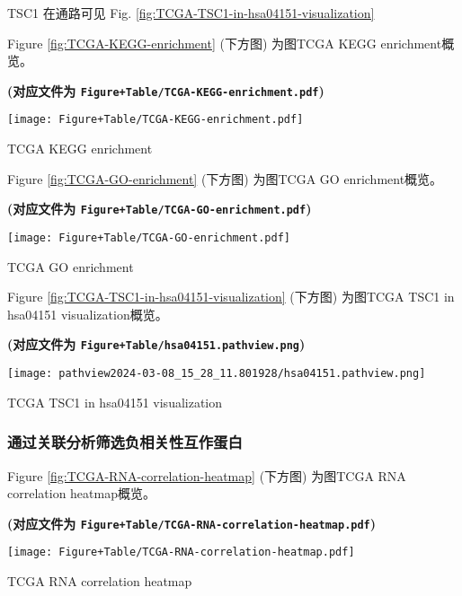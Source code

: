 \documentclass[
]{article}
\begin{document}
TSC1 在通路可见 Fig. \ref{fig:TCGA-TSC1-in-hsa04151-visualization}

Figure \ref{fig:TCGA-KEGG-enrichment} (下方图) 为图TCGA KEGG enrichment概览。

\textbf{(对应文件为 \texttt{Figure+Table/TCGA-KEGG-enrichment.pdf})}

\def\@captype{figure}
\begin{center}
\texttt{[image: Figure+Table/TCGA-KEGG-enrichment.pdf]}
\caption{TCGA KEGG enrichment}\label{fig:TCGA-KEGG-enrichment}
\end{center}

Figure \ref{fig:TCGA-GO-enrichment} (下方图) 为图TCGA GO enrichment概览。

\textbf{(对应文件为 \texttt{Figure+Table/TCGA-GO-enrichment.pdf})}

\def\@captype{figure}
\begin{center}
\texttt{[image: Figure+Table/TCGA-GO-enrichment.pdf]}
\caption{TCGA GO enrichment}\label{fig:TCGA-GO-enrichment}
\end{center}

Figure \ref{fig:TCGA-TSC1-in-hsa04151-visualization} (下方图) 为图TCGA TSC1 in hsa04151 visualization概览。

\textbf{(对应文件为 \texttt{Figure+Table/hsa04151.pathview.png})}

\def\@captype{figure}
\begin{center}
\texttt{[image: pathview2024-03-08\_15\_28\_11.801928/hsa04151.pathview.png]}
\caption{TCGA TSC1 in hsa04151 visualization}\label{fig:TCGA-TSC1-in-hsa04151-visualization}
\end{center}

\hypertarget{ux901aux8fc7ux5173ux8054ux5206ux6790ux7b5bux9009ux8d1fux76f8ux5173ux6027ux4e92ux4f5cux86cbux767d}{%
\subsubsection{通过关联分析筛选负相关性互作蛋白}\label{ux901aux8fc7ux5173ux8054ux5206ux6790ux7b5bux9009ux8d1fux76f8ux5173ux6027ux4e92ux4f5cux86cbux767d}}

Figure \ref{fig:TCGA-RNA-correlation-heatmap} (下方图) 为图TCGA RNA correlation heatmap概览。

\textbf{(对应文件为 \texttt{Figure+Table/TCGA-RNA-correlation-heatmap.pdf})}

\def\@captype{figure}
\begin{center}
\texttt{[image: Figure+Table/TCGA-RNA-correlation-heatmap.pdf]}
\caption{TCGA RNA correlation heatmap}\label{fig:TCGA-RNA-correlation-heatmap}
\end{center}
\end{document}
